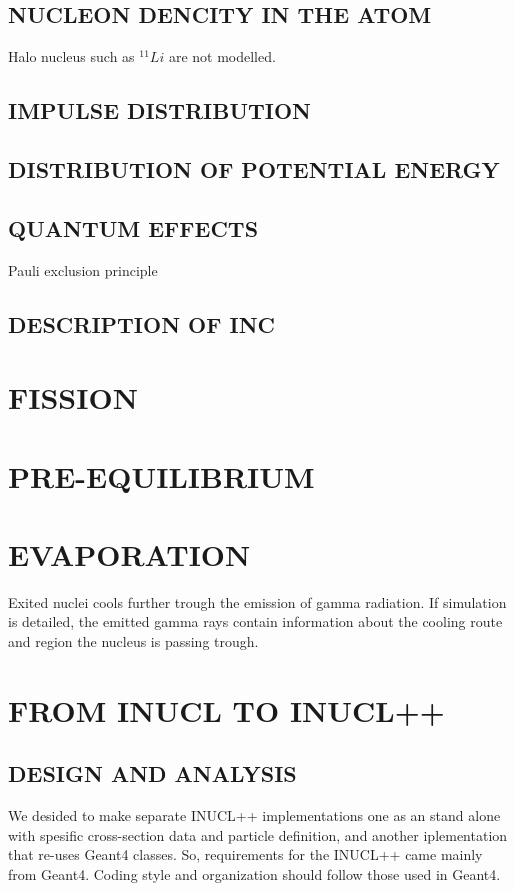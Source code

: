 \subsection{NUCLEON DENCITY IN THE ATOM}

Halo nucleus such as $^{11}Li$ are not modelled.

\subsection{IMPULSE DISTRIBUTION}

\subsection{DISTRIBUTION OF POTENTIAL ENERGY}

\subsection{QUANTUM EFFECTS}
Pauli exclusion principle

\subsection{DESCRIPTION OF INC}


\section{FISSION}

\section{PRE-EQUILIBRIUM}

\section{EVAPORATION}
Exited nuclei cools further trough the emission of gamma radiation.
If simulation is detailed,
the emitted gamma rays contain information about the cooling route 
and region the nucleus is passing trough.

\section{FROM INUCL TO INUCL++}

\subsection{DESIGN AND ANALYSIS}
We desided to make separate INUCL++ implementations one as an stand
alone with spesific cross-section data and particle definition, and
another iplementation that re-uses Geant4 classes.
So, requirements for the INUCL++ came mainly from Geant4.
Coding style and organization should follow those used in Geant4.


